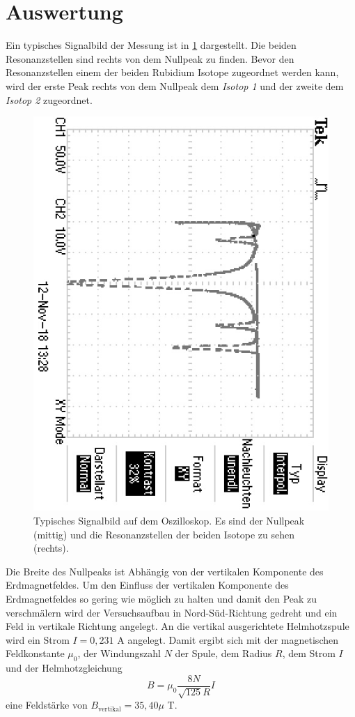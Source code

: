 \section{Auswertung}
\label{sec:Auswertung}
Ein typisches Signalbild der Messung ist in \ref{fig:Signal} dargestellt. Die beiden
Resonanzstellen sind rechts von dem Nullpeak zu finden. Bevor den Resonanzstellen einem
der beiden Rubidium Isotope zugeordnet werden kann, wird der erste Peak rechts von dem Nullpeak
dem \textit{Isotop 1} und der zweite dem  \textit{Isotop 2} zugeordnet.
\begin{figure}
  \centering
  \includegraphics[angle=90]{pics/TEK0000.JPG}
  \caption{Typisches Signalbild auf dem Oszilloskop. Es sind der Nullpeak (mittig) und
           die Resonanzstellen der beiden Isotope zu sehen (rechts).}
  \label{fig:Signal}
\end{figure}
Die Breite des Nullpeaks ist Abhängig von der vertikalen Komponente des Erdmagnetfeldes.
Um den Einfluss der vertikalen Komponente des Erdmagnetfeldes so gering wie möglich zu halten
und damit den Peak zu verschmälern wird der Versuchsaufbau in Nord-Süd-Richtung gedreht und ein
Feld in vertikale Richtung angelegt.
An die vertikal ausgerichtete Helmhotzspule wird ein Strom $I= 0,231$ A angelegt. Damit
ergibt sich mit der magnetischen Feldkonstante $\mu_{0}$, der Windungszahl $N$ der Spule,
dem Radius $R$, dem Strom $I$ und der Helmhotzgleichung
\begin{equation}
  B=\mu_{0}\frac{8 N }{\sqrt{125} R}I
\end{equation} eine Feldstärke von $B_{\text{vertikal}}=35,40 \mu$ T.

